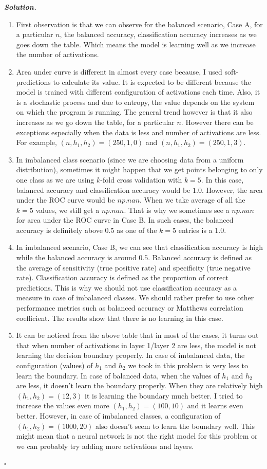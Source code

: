 \documentclass[10pt]{article}
\newenvironment{solution}[1][\it{Solution}]{\textbf{#1. } }{$\square$}
\begin{document}
\begin{solution}
\begin{enumerate}
  \item First observation is that we can observe for the balanced scenario, Case A, for a particular $n$, the balanced accuracy, classification accuracy increases as we goes down the table. Which means the model is learning well as we increase the number of activations.
  \item Area under curve is different in almost every case because, I used soft-predictions to calculate its value. It is expected to be different because the model is trained with different configuration of activations each time. Also, it is a stochastic process and due to entropy, the value depends on the system on which the program is running. The general trend however is that it also increases as we go down the table, for a particular $n$. However there can be exceptions especially when the data is less and number of activations are less. For example, $\left(n, h_1, h_2\right) = \left(250, 1, 0\right)$ and $\left(n, h_1, h_2\right) = \left(250, 1, 3\right)$.
  \item In imbalanced class scenario (since we are choosing data from a uniform distribution), sometimes it might happen that we get points belonging to only one class as we are using $k$-fold cross validation with $k = 5$. In this case, balanced accuracy and classification accuracy would be $1.0$. However, the area under the ROC curve would be $np.nan$. When we take average of all the $k=5$ values, we still get a $np.nan$. That is why we sometimes see a $np.nan$ for area under the ROC curve in Case B. In such cases, the balanced accuracy is definitely above $0.5$ as one of the $k=5$ entries is a $1.0$.
  \item In imbalanced scenario, Case B, we can see that classification accuracy is high while the balanced accuracy is around $0.5$. Balanced accuracy is defined as the average of sensitivity (true positive rate) and specificity (true negative rate). Classification accuracy is defined as the proportion of correct predictions. This is why we should not use classification accuracy as a measure in case of imbalanced classes. We should rather prefer to use other performance metrics such as balanced accuracy or Matthews correlation coefficient. The results show that there is no learning in this case.
  \item It can be noticed from the above table that in most of the cases, it turns out that when number of activations in layer 1/layer 2 are less, the model is not learning the decision boundary properly. In case of imbalanced data, the configuration (values) of $h_1$ and $h_2$ we took in this problem is very less to learn the boundary. In case of balanced data, when the values of $h_1$ and $h_2$ are less, it doesn't learn the boundary properly. When they are relatively high $(h_1, h_2) = (12, 3)$ it is learning the boundary much better. I tried to increase the values even more $(h_1, h_2) = (100, 10)$ and it learns even better. However, in case of imbalanced classes, a configuration of $(h_1, h_2) = (1000, 20)$ also doesn't seem to learn the boundary well. This might mean that a neural network is not the right model for this problem or we can probably try adding more activations and layers.

\end{enumerate}
\end{solution}
\end{document}

